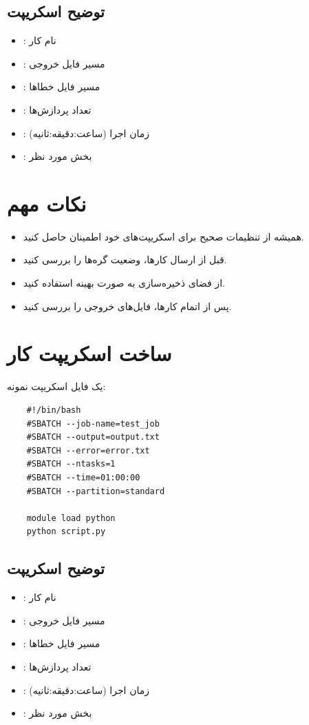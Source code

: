 \documentclass[a4paper,12pt]{article}
\begin{document}
\subsection{توضیح اسکریپت}
\begin{itemize}
    \item {}: نام کار
    \item {}: مسیر فایل خروجی
    \item {}: مسیر فایل خطاها
    \item {}: تعداد پردازش‌ها
    \item {}: زمان اجرا (ساعت:دقیقه:ثانیه)
    \item {}: بخش مورد نظر
\end{itemize}

\section{نکات مهم}
\begin{itemize}
    \item همیشه از تنظیمات صحیح برای اسکریپت‌های خود اطمینان حاصل کنید.
    \item قبل از ارسال کارها، وضعیت گره‌ها را بررسی کنید.
    \item از فضای ذخیره‌سازی به صورت بهینه استفاده کنید.
    \item پس از اتمام کارها، فایل‌های خروجی را بررسی کنید.
\end{itemize}
\section{ساخت اسکریپت کار}
یک فایل اسکریپت نمونه:
\begin{latin}
	\begin{verbatim}
	#!/bin/bash
	#SBATCH --job-name=test_job
	#SBATCH --output=output.txt
	#SBATCH --error=error.txt
	#SBATCH --ntasks=1
	#SBATCH --time=01:00:00
	#SBATCH --partition=standard
	
	module load python
	python script.py
	\end{verbatim}
\end{latin}

\subsection{توضیح اسکریپت}
\begin{itemize}
	\item {}: نام کار
	\item {}: مسیر فایل خروجی
	\item {}: مسیر فایل خطاها
	\item {}: تعداد پردازش‌ها
	\item {}: زمان اجرا (ساعت:دقیقه:ثانیه)
	\item {}: بخش مورد نظر
\end{itemize}
\end{document}
